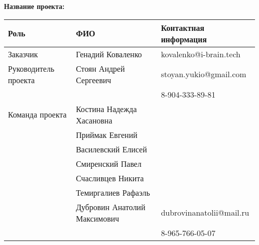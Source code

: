 \documentclass[a4paper,12pt]{article}
\begin{document}
\textbf{Название проекта: }

\vspace{5ex}


\begin{tabular}{|l|l|l|}
    \hline
    \textbf{Роль} & \textbf{ФИО} & \textbf{Контактная информация} \\
    \hline 
    Заказчик & Генадий Коваленко & kovalenko@i-brain.tech \\
    \hline
    Руководитель проекта & Стоян Андрей Сергеевич 
       & stoyan.yukio@gmail.com \\ 
     & & 8-904-333-89-81 \\ 
    \hline
    Команда проекта 
     & Костина Надежда Хасановна & \\ \cline{2-3}
     & Приймак Евгений & \\ \cline{2-3}
     & Василевский Елисей & \\ \cline{2-3}
     & Смиренский Павел & \\ \cline{2-3}
     & Счасливцев Никита & \\ \cline{2-3}
     & Темиргалиев Рафаэль & \\ \cline{2-3}
     & Дубровин Анатолий Максимович
     & dubrovinanatolii@mail.ru \\ 
     & & 8-965-766-05-07 \\
    \hline
\end{tabular}
\end{document}
